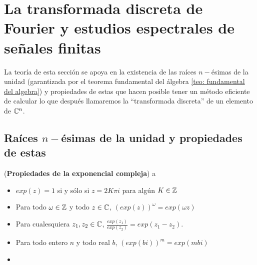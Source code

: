 \section{La transformada discreta de Fourier y estudios espectrales de señales finitas}


La teoría de esta sección se apoya en la existencia de las raíces
$n-$ésimas de la unidad (garantizada por el teorema fundamental
del álgebra \ref{teo: fundamental del algebra}) 
y propiedades de estas que hacen posible
tener un método eficiente de calcular lo que después llamaremos
la ``transformada discreta'' de un elemento de $\mathbb{C}^{n}$.

\subsection{Raíces $n-$ésimas de la unidad y propiedades de estas}



\begin{prop}
\label{prop: propiedades exp compleja}
(\textbf{Propiedades de la exponencial compleja}) a
	\begin{itemize}
	\item $exp(z) = 1$ si y sólo si $z= 2K \pi i$ para algún $K \in \mathbb{Z}$
	\item Para todo $\omega \in \mathbb{Z}$ y todo $z \in \mathbb{C}$, $(exp(z))^{\omega} = 			exp(\omega z)$ 
	\item Para cualesquiera $z_{1}, z_{2} \in \mathbb{C}$, 
	$\frac{exp(z_{1})}{exp(z_{2})} = exp(z_{1} - z_{2})$.
	\item Para todo entero $n$ y todo real $b$,
	$(exp(bi))^{m} = exp (mb i)$
	\item {}
	\end{itemize}
\end{prop}


